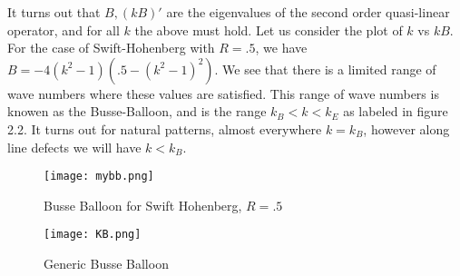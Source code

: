 \documentclass[12pt]{article}
\numberwithin{equation}{section}
\begin{document}
It turns out that $B, (kB)'$ are the eigenvalues of the second order quasi-linear operator, and for all $k$ the above must hold. Let us consider the plot of $k$ vs $kB$. For the case of Swift-Hohenberg with $R=.5$, we have $B = -4(k^2-1)(.5-(k^2-1)^2)$. We see that there is a limited range of wave numbers where these values are satisfied. This range of wave numbers is knowen as the Busse-Balloon, and is the range $k_B<k<k_E$ as labeled in figure 2.2. It turns out for natural patterns, almost everywhere $k=k_B$, however along line defects we will have $k<k_B$.  
\begin{figure}
\centering
\texttt{[image: mybb.png]}
\caption{Busse Balloon for Swift Hohenberg, $R=.5$}
\end{figure}
\begin{figure}
\centering
\texttt{[image: KB.png]}
\caption{Generic Busse Balloon}
\end{figure}
\end{document}
